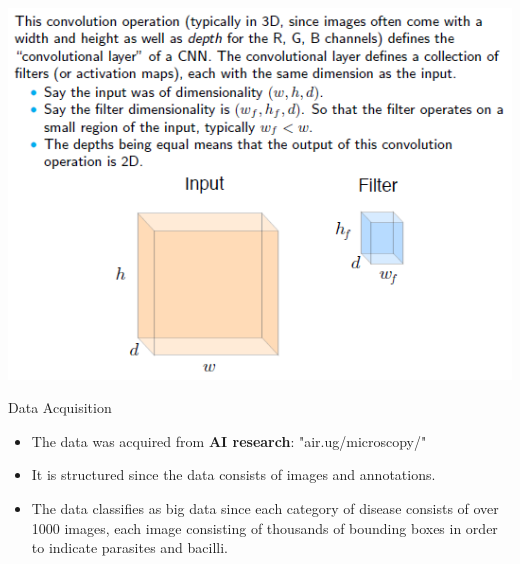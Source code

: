 \documentclass{beamer}
\begin{document}
\begin{frame}
	\begin{block}{\color{red}{Convolutional Layer}}
		\includegraphics[scale = 0.7]{cnn_math3.png}
	\end{block}
\end{frame}

\begin{frame}[t]{Data Acquisition}
	\begin{block}{\color{red}{Data Sources}}\vspace{5pt}\small
		\begin{itemize}

		\item The data was acquired from \textbf{AI research}: "air.ug/microscopy/" 
		
		\item It is structured since the data consists of images and annotations.
		
		\item The data classifies as big data since each category of disease consists of over 1000 images, each image consisting of thousands of bounding boxes in order to indicate parasites and bacilli.
		
	\end{itemize}
	\end{block}
\end{frame}
\end{document}
